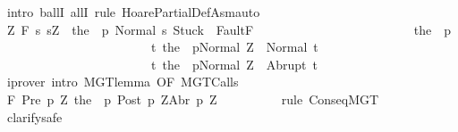 \begin{isabellebody}
\ {\isacharparenleft}intro\ ballI\ allI{\isacharcomma}\ rule\ HoarePartialDef{\isachardot}Asm{\isacharcomma}auto{\isacharparenright}\isanewline
\ \ \ \ \ \ \isamarkupfalse%
\ {\isachardoublequoteopen}{\isasymforall}Z{\isachardot}\ {\isasymGamma}{\isacharcomma}{\isacharquery}{\isasymTheta}{\isasymturnstile}\isactrlbsub {\isacharslash}F\isactrlesub \ {\isacharbraceleft}s{\isachardot}\ s{\isacharequal}Z\ {\isasymand}\ {\isasymGamma}{\isasymturnstile}{\isasymlangle}the\ {\isacharparenleft}{\isasymGamma}\ p{\isacharparenright}\ {\isacharcomma}Normal\ s{\isasymrangle}\ {\isasymRightarrow}{\isasymnotin}{\isacharparenleft}{\isacharbraceleft}Stuck{\isacharbraceright}\ {\isasymunion}\ Fault{\isacharbackquote}{\isacharparenleft}{\isacharminus}F{\isacharparenright}{\isacharparenright}{\isacharbraceright}\ \isanewline
\ \ \ \ \ \ \ \ \ \ \ \ \ \ \ \ \ \ \ \ \ \ \ \ {\isacharparenleft}the\ {\isacharparenleft}{\isasymGamma}\ p{\isacharparenright}{\isacharparenright}\isanewline
\ \ \ \ \ \ \ \ \ \ \ \ \ \ \ \ \ \ \ \ \ \ \ \ {\isacharbraceleft}t{\isachardot}\ {\isasymGamma}{\isasymturnstile}{\isasymlangle}the\ {\isacharparenleft}{\isasymGamma}\ p{\isacharparenright}{\isacharcomma}Normal\ Z{\isasymrangle}\ {\isasymRightarrow}\ Normal\ t{\isacharbraceright}{\isacharcomma}\isanewline
\ \ \ \ \ \ \ \ \ \ \ \ \ \ \ \ \ \ \ \ \ \ \ \ {\isacharbraceleft}t{\isachardot}\ {\isasymGamma}{\isasymturnstile}{\isasymlangle}the\ {\isacharparenleft}{\isasymGamma}\ p{\isacharparenright}{\isacharcomma}Normal\ Z{\isasymrangle}\ {\isasymRightarrow}\ Abrupt\ t{\isacharbraceright}{\isachardoublequoteclose}\isanewline
\ \ \ \ \ \ \ \ \isamarkupfalse%
\ {\isacharparenleft}iprover\ intro{\isacharcolon}\ MGT{\isacharunderscore}lemma\ {\isacharbrackleft}OF\ MGT{\isacharunderscore}Calls{\isacharbrackright}{\isacharparenright}\isanewline
\ \ \ \ \ \ \isamarkupfalse%
\ {\isachardoublequoteopen}{\isasymGamma}{\isacharcomma}{\isacharquery}{\isasymTheta}{\isasymturnstile}\isactrlbsub {\isacharslash}F\isactrlesub \ {\isacharparenleft}{\isacharquery}Pre\ p\ Z{\isacharparenright}\ {\isacharparenleft}the\ {\isacharparenleft}{\isasymGamma}\ p{\isacharparenright}{\isacharparenright}\ {\isacharparenleft}{\isacharquery}Post\ p\ Z{\isacharparenright}{\isacharcomma}{\isacharparenleft}{\isacharquery}Abr\ p\ Z{\isacharparenright}{\isachardoublequoteclose}\isanewline
\ \ \ \ \ \ \ \ \isamarkupfalse%
\ {\isacharparenleft}rule\ ConseqMGT{\isacharparenright}\isanewline
\ \ \ \ \ \ \ \ \isamarkupfalse%
\ {\isacharparenleft}clarify{\isacharcomma}safe{\isacharparenright}\isanewline

\end{isabellebody}
